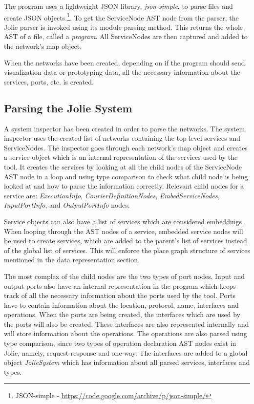 The \javatoolname[] program uses a lightweight JSON library, \emph{json-simple}, to parse files and create JSON objects.\footnote{JSON-simple - \url{https://code.google.com/archive/p/json-simple/}}.
To get the ServiceNode AST node from the parser, the Jolie parser is invoked using its module parsing method. This returns the whole AST of a file, called a \emph{program}. All ServiceNodes are then captured and added to the network's map object.

When the networks have been created, depending on if the program should send visualization data or prototyping data, all the necessary information about the services, ports, etc. is created.
\subsection{Parsing the Jolie System}
A system inspector has been created in order to parse the networks.
The system inspector uses the created list of networks containing the top-level services and ServiceNodes.
The inspector goes through each network's map object and creates a service object which is an internal representation of the services used by the tool.
It creates the services by looking at all the child nodes of the ServiceNode AST node in a loop and using type comparison to check what child node is being looked at and how to parse the information correctly.
Relevant child nodes for a service are: \emph{ExecutionInfo}, \emph{CourierDefinitionNodes}, \emph{EmbedServiceNodes}, \emph{InputPortInfo}, and \emph{OutputPortInfo} nodes.

Service objects can also have a list of services which are considered embeddings. When looping through the AST nodes of a service, embedded service nodes will be used to create services, which are added to the parent's list of services instead of the global list of services.
This will enforce the place graph structure of services mentioned in the data representation section.

The most complex of the child nodes are the two types of port nodes. Input and output ports also have an internal representation in the \javatoolname[] program which keeps track of all the necessary information about the ports used by the tool.
Ports have to contain information about the location, protocol, name, interfaces and operations.
When the ports are being created, the interfaces which are used by the ports will also be created. These interfaces are also represented internally and will store information about the operations.
The operations are also parsed using type comparison, since two types of operation declaration AST nodes exist in Jolie, namely, request-response and one-way.
The interfaces are added to a global object \emph{JolieSystem} which has information about all parsed services, interfaces and types.

